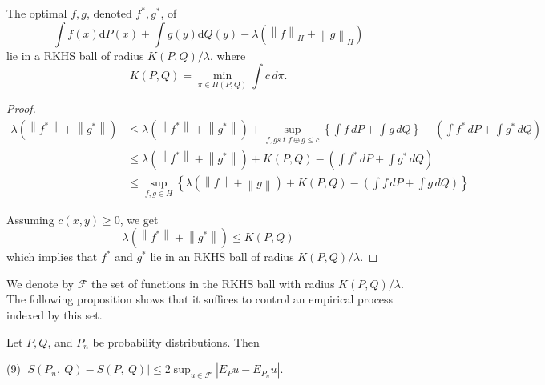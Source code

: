 	\begin{prop}
		The optimal $f,g$, denoted $f^*,g^*$, of $$\int f(x)\mathrm{d}P(x)+\int g(y)\mathrm{d}Q(y)-\lambda(\left\|f\right\|_H+\left\|g\right\|_H)$$ lie in a RKHS ball of radius $K(P,Q)/\lambda$, where 
		$$
		K(P,Q)=\min_{\pi\in \Pi(P,Q)} \int c\,d\pi.
		$$
	\end{prop}
	\begin{proof}
		\begin{align*}
			\lambda (\left\|f^*\right\|+\left\|g^*\right\|)&\leq \lambda (\left\|f^*\right\|+\left\|g^*\right\|) + \sup_{f,g s.t. f\oplus g\leq c} \left\{\int f\,dP + \int g\,dQ \right\} - \left(\int f^{*}\,dP + \int g^{*}\,dQ\right) \\
			&\leq \lambda (\left\|f^*\right\|+\left\|g^*\right\|) + K(P,Q) - \left(\int f^{*}\,dP + \int g^{*}\,dQ\right) \\
			&\leq \sup_{f,g\in H} \left\{\lambda (\left\|f\right\|+\left\|g\right\|) + K(P,Q) - \left(\int f\,dP + \int g\,dQ\right)\right\}
		\end{align*}
		
		Assuming $c(x,y)\geq 0$, we get $$\lambda(\left\|f^*\right\|+\left\|g^*\right\|)\leq K(P,Q)$$ which implies that $f^*$ and $g^*$ lie in an RKHS ball of radius $K(P,Q)/\lambda$.
	\end{proof}
	
	We denote by $\mathcal{F}$ the set of functions in the RKHS ball with radius $K(P,Q)/\lambda$. The following proposition shows that it suffices to control an empirical process indexed by this set.
	
	\begin{prop}
		Let $P, Q$, and $P_{n}$ be probability distributions.
		Then
		\begin{center}
			(9)   $|S(P_{n},\displaystyle \ Q)-S(P,\ Q)|\leq 2\sup_{u\in \mathcal{F}}|E_{P}u-E_{P_n}u|.$
		\end{center}
	\end{prop}
	
